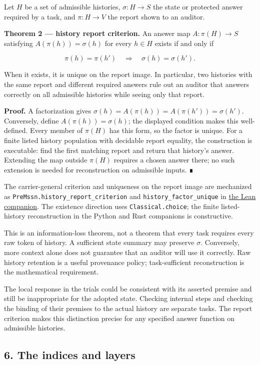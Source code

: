 \documentclass[
  11pt,
]{article}
\begin{document}
Let \(H\) be a set of admissible histories, \(\sigma:H\to S\) the state
or protected answer required by a task, and \(\pi:H\to V\) the report
shown to an auditor.

\textbf{Theorem 2 --- history report criterion.} An answer map
\(A:\pi(H)\to S\) satisfying \(A(\pi(h))=\sigma(h)\) for every
\(h\in H\) exists if and only if

\[
\pi(h)=\pi(h')\quad\Longrightarrow\quad\sigma(h)=\sigma(h').
\]

When it exists, it is unique on the report image. In particular, two
histories with the same report and different required answers rule out
an auditor that answers correctly on all admissible histories while
seeing only that report.

\textbf{Proof.} A factorization gives
\(\sigma(h)=A(\pi(h))=A(\pi(h'))=\sigma(h')\). Conversely, define
\(A(\pi(h))=\sigma(h)\); the displayed condition makes this
well-defined. Every member of \(\pi(H)\) has this form, so the factor is
unique. For a finite listed history population with decidable report
equality, the construction is executable: find the first matching report
and return that history's answer. Extending the map outside \(\pi(H)\)
requires a chosen answer there; no such extension is needed for
reconstruction on admissible inputs. ∎

The carrier-general criterion and uniqueness on the report image are
mechanized as \nolinkurl{PreMssn.history_report_criterion} and
\nolinkurl{history_factor_unique} in \href{lean4/Paper.lean}{the Lean
companion}. The existence direction uses \nolinkurl{Classical.choice}; the
finite listed-history reconstruction in the Python and Rust companions
is constructive.

This is an information-loss theorem, not a theorem that every task
requires every raw token of history. A sufficient state summary may
preserve \(\sigma\). Conversely, more context alone does not guarantee
that an auditor will use it correctly. Raw history retention is a useful
provenance policy; task-sufficient reconstruction is the mathematical
requirement.

The local response in the trials could be consistent with its asserted
premise and still be inappropriate for the adopted state. Checking
internal steps and checking the binding of their premises to the actual
history are separate tasks. The report criterion makes this distinction
precise for any specified answer function on admissible histories.

\subsection{6. The indices and layers}\label{the-indices-and-layers}
\end{document}
